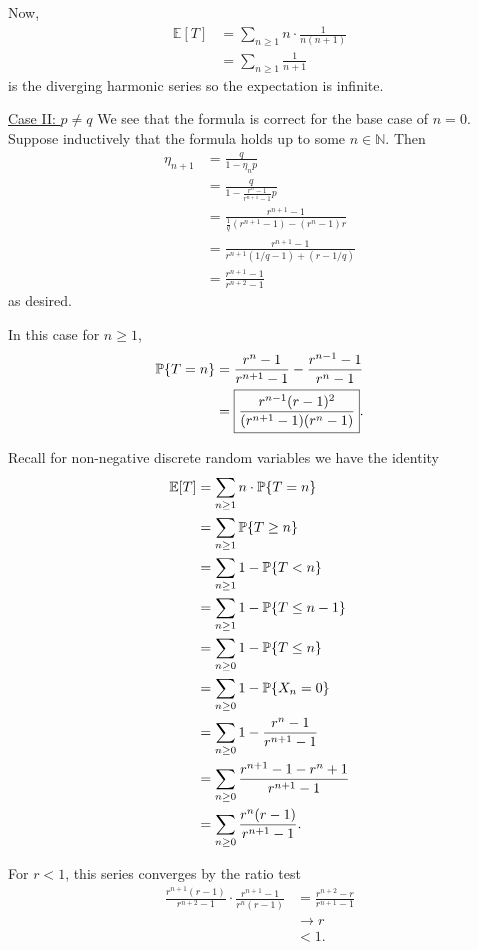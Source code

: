 \documentclass[10pt]{article}
\DeclarePairedDelimiter{\set}{\lbrace}{\rbrace}
\newcommand{\E}{\mathbb{E}}
\newcommand{\N}{\mathbb{N}}
\renewcommand{\P}{\mathbb{P}}
\begin{document}
Now,
\begin{align*}
  \E[T]
  &= \sum_{n\geq 1} n\cdot \frac1{n(n+1)} \\
  &= \sum_{n\geq 1} \frac1{n+1}
\end{align*}
is the diverging harmonic series so the expectation is infinite.

\underline{Case II: $p\neq q$}
We see that the formula is correct for the base case of $n=0$.
Suppose inductively that the formula holds up to some $n\in \N$.
Then
\begin{align*}
  \eta_{n+1}
  &= \frac{q}{1-\eta_n p} \\
  &= \frac{q}{1- \frac{r^n-1}{r^{n+1}-1} p} \\
  &= \frac{r^{n+1}-1}{\frac1q (r^{n+1}-1) - (r^n-1)r} \\
  &= \frac{r^{n+1}-1}{r^{n+1} (1/q-1) + (r-1/q)} \\
  &= \frac{r^{n+1}-1}{r^{n+2}-1}
\end{align*}
as desired.

In this case for $n\geq 1$,
\begin{align*}
  \P\set{T=n}
  &= \frac{r^n-1}{r^{n+1}-1} - \frac{r^{n-1}-1}{r^{n}-1} \\
  &= \boxed{\frac{r^{n-1} (r-1)^2}{(r^{n+1}-1)(r^n-1)}}.
\end{align*}

Recall for non-negative discrete random variables
we have the identity
\begin{align*}
  \E[T]
  &= \sum_{n\geq 1} n\cdot \P\set{T=n} \\
  &= \sum_{n\geq 1} \P\set{T\geq n} \\
  &= \sum_{n\geq 1} 1- \P\set{T<n} \\
  &= \sum_{n\geq 1} 1- \P\set{T\leq n-1} \\
  &= \sum_{n\geq 0} 1- \P\set{T\leq n} \\
  &= \sum_{n\geq 0} 1- \P\set{X_n = 0} \\
  &= \sum_{n\geq 0} 1 - \frac{r^{n} - 1}{r^{n+1}-1} \\
  &= \sum_{n\geq 0} \frac{r^{n+1} - 1 - r^{n} + 1}{r^{n+1}-1} \\
  &= \sum_{n\geq 0} \frac{r^n(r - 1)}{r^{n+1}-1}.
\end{align*}

For $r < 1$,
this series converges by the ratio test
\begin{align*}
  \frac{r^{n+1}(r-1)}{r^{n+2}-1}\cdot \frac{r^{n+1}-1}{r^n (r-1)}
  &= \frac{r^{n+2} - r}{r^{n+1}-1} \\
  &\to r \\
  &< 1.
\end{align*}
\end{document}
